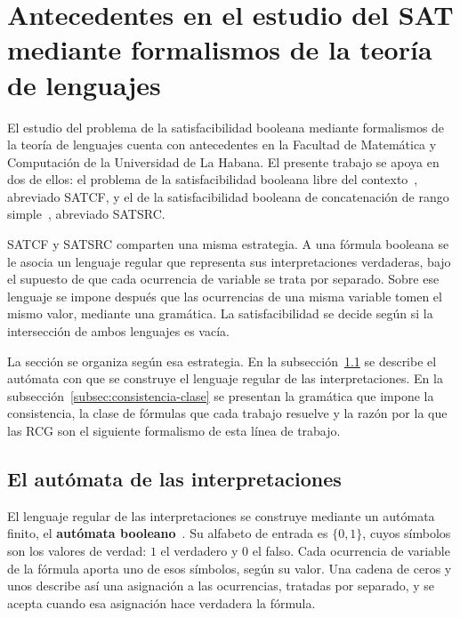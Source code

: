 \documentclass{report}
\theoremstyle{definition}
\theoremstyle{plain}
\theoremstyle{remark}
\begin{document}
\section{Antecedentes en el estudio del SAT mediante formalismos de la teoría de lenguajes}
\label{sec:antecedentes}

El estudio del problema de la satisfacibilidad booleana mediante
formalismos de la teoría de lenguajes cuenta con antecedentes en la
Facultad de Matemática y Computación de la Universidad de La Habana. El
presente trabajo se apoya en dos de ellos: el problema de la
satisfacibilidad booleana libre del contexto~\cite{fernandezarias2007},
abreviado SATCF, y el de la satisfacibilidad booleana de concatenación
de rango simple~\cite{aguileralopez2016}, abreviado SATSRC.

SATCF y SATSRC comparten una misma estrategia. A una fórmula booleana se
le asocia un lenguaje regular que representa sus interpretaciones
verdaderas, bajo el supuesto de que cada ocurrencia de variable se trata
por separado. Sobre ese lenguaje se impone después que las ocurrencias
de una misma variable tomen el mismo valor, mediante una gramática. La
satisfacibilidad se decide según si la intersección de ambos lenguajes
es vacía.

La sección se organiza según esa estrategia. En la
subsección~\ref{subsec:automata-interpretaciones} se describe el
autómata con que se construye el lenguaje regular de las
interpretaciones. En la subsección~\ref{subsec:consistencia-clase} se
presentan la gramática que impone la consistencia, la clase de fórmulas
que cada trabajo resuelve y la razón por la que las RCG son el
siguiente formalismo de esta línea de trabajo.

\subsection{El autómata de las interpretaciones}
\label{subsec:automata-interpretaciones}

El lenguaje regular de las interpretaciones se construye mediante un
autómata finito, el \textbf{autómata
  booleano}~\cite{fernandezarias2007}. Su alfabeto de entrada es
$\{0,1\}$, cuyos símbolos son los valores de verdad: $1$ el verdadero y
$0$ el falso. Cada ocurrencia de variable de la fórmula aporta uno de
esos símbolos, según su valor. Una cadena de ceros y unos describe así
una asignación a las ocurrencias, tratadas por separado, y se acepta
cuando esa asignación hace verdadera la fórmula.
\end{document}
